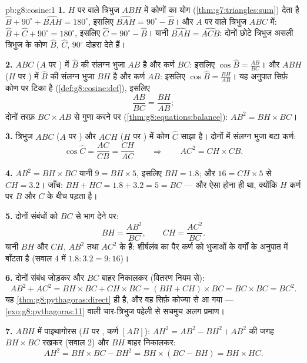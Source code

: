 \begin{solution}{pb:g8:cosine:1}
\textbf{1.} $H$ पर  वाले त्रिभुज $ABH$ में कोणों का योग
(\cref{thm:g7:triangles:sum}) देता है
$\widehat B + 90^\circ + \widehat{BAH} = 180^\circ$, इसलिए
$\widehat{BAH} = 90^\circ - \widehat B$। और $A$ पर  वाले
त्रिभुज $ABC$ में:
$\widehat B + \widehat C + 90^\circ = 180^\circ$, इसलिए
$\widehat C = 90^\circ - \widehat B$। यानी
$\widehat{BAH} = \widehat{ACB}$: दोनों छोटे त्रिभुज असली त्रिभुज के
कोण $\widehat B$, $\widehat C$, $90^\circ$ दोहरा देते हैं।

\textbf{2.} $ABC$ ($A$ पर ) में $\widehat B$ की संलग्न भुजा
$AB$ है और कर्ण $BC$: इसलिए $\cos\widehat B = \frac{AB}{BC}$। और
$ABH$ ($H$ पर ) में $\widehat B$ की संलग्न भुजा $BH$ है और
कर्ण $AB$: इसलिए $\cos\widehat B = \frac{BH}{AB}$। यह अनुपात सिर्फ़
कोण पर टिका है (\cref{def:g8:cosine:def}), इसलिए
\[
\frac{AB}{BC} = \frac{BH}{AB} ;
\]
दोनों तरफ़ $BC \times AB$ से गुणा करने पर
(\cref{thm:g8:equations:balance}):
$AB^2 = BH \times BC$।

\textbf{3.} त्रिभुज $ABC$ ($A$ पर ) और $ACH$ ($H$ पर )
में कोण $\widehat C$ साझा है। दोनों में संलग्न भुजा बटा कर्ण:
\[
\cos\widehat C = \frac{AC}{CB} = \frac{CH}{AC}
\qquad\Longrightarrow\qquad
AC^2 = CH \times CB .
\]

\textbf{4.} $AB^2 = BH \times BC$ यानी $9 = BH \times 5$, इसलिए
$BH = 1.8$; और $16 = CH \times 5$ से $CH = 3.2$। जाँच:
$BH + HC = 1.8 + 3.2 = 5 = BC$ --- और ऐसा होना ही था, क्योंकि $H$
कर्ण पर $B$ और $C$ के बीच पड़ता है।

\textbf{5.} दोनों संबंधों को $BC$ से भाग देने पर:
\[
BH = \frac{AB^2}{BC},
\qquad
CH = \frac{AC^2}{BC} .
\]
यानी $BH$ और $CH$, $AB^2$ तथा $AC^2$ के  हैं: शीर्षलंब का
पैर कर्ण को  भुजाओं के वर्गों के अनुपात में बाँटता है (सवाल 4
में $1.8 : 3.2 = 9 : 16$)।

\textbf{6.} दोनों संबंध जोड़कर और $BC$ बाहर निकालकर (वितरण नियम
से):
\[
AB^2 + AC^2 = BH \times BC + CH \times BC
= (BH + CH) \times BC = BC \times BC = BC^2 .
\]
यह \cref{thm:g8:pythagoras:direct} ही है, और वह सिर्फ़ कोज्या से आ
गया --- \cref{exo:g8:pythagoras:11} वाली चार-त्रिभुज 
पहेली से सचमुच अलग प्रमाण।

\textbf{7.} $ABH$ में पाइथागोरस ($H$ पर , कर्ण $[AB]$):
$AH^2 = AB^2 - BH^2$। $AB^2$ की जगह $BH \times BC$ रखकर (सवाल 2)
और $BH$ बाहर निकालकर:
\[
AH^2 = BH \times BC - BH^2
= BH \times (BC - BH)
= BH \times HC .
\]


\end{solution}
